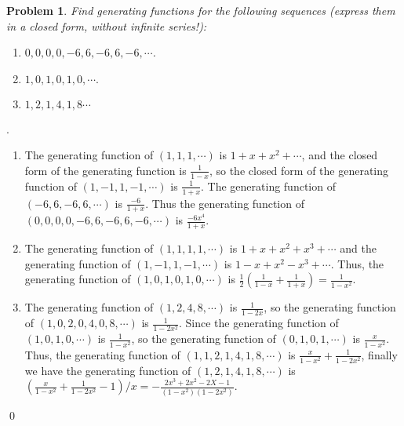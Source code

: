 \documentclass[12pt]{article}
\newtheorem{hw}{Problem}
\newenvironment{sol}
  {\par\vspace{3mm}\noindent{\it Solution}.}
  {\qed}
\begin{document}
\begin{hw} Find generating functions for the following sequences (express them in a closed form, without infinite series!):
\begin{enumerate}
  \item $0,0,0,0,-6,6,-6,6,-6,\cdots$.
  \item $1,0,1,0,1,0,\cdots.$
  \item $1,2,1,4,1,8\cdots$
\end{enumerate}
\end{hw}
\begin{sol}
	\begin{enumerate}
		\item The generating function of $(1,1,1,\cdots)$ is $1 + x + x^2 + \cdots$, and the closed form of the generating function is $\frac{1}{1-x}$, so the closed form of the generating function of $(1,-1,1,-1,\cdots)$ is $\frac{1}{1+x}$. The generating function of $(-6,6,-6,6,\cdots)$ is $\frac{-6}{1+x}$. Thus the generating function of $(0,0,0,0,-6,6,-6,6,-6,\cdots)$ is $\frac{-6x^4}{1+x}$.
		
		\item The generating function of $(1,1,1,1,\cdots)$ is $1 + x + x^2 + x^3 + \cdots$ and the generating function of $(1,-1,1,-1,\cdots)$ is $1 - x + x^2 - x^3 + \cdots$. Thus, the generating function of $(1,0,1,0,1,0,\cdots)$ is $\frac{1}{2}(\frac{1}{1-x}+\frac{1}{1+x}) = \frac{1}{1-x^2}$.
		
		\item The generating function of $(1,2,4,8,\cdots)$ is $\frac{1}{1-2x}$, so the generating function of $(1,0,2,0,4,0,8,\cdots)$ is $\frac{1}{1-2x^2}$. Since the generating function of $(1,0,1,0,\cdots)$ is $\frac{1}{1-x^2}$, so the generating function of $(0,1,0,1,\cdots)$ is $\frac{x}{1-x^2}$. Thus, the generating function of $(1,1,2,1,4,1,8,\cdots)$ is $\frac{x}{1-x^2} + \frac{1}{1-2x^2}$, finally we have the generating function of $(1,2,1,4,1,8,\cdots)$ is $\left(\frac{x}{1-x^2} + \frac{1}{1-2x^2} - 1\right)/x = -\frac{2x^3+2x^2-2X-1}{(1-x^2)(1-2x^2)}$.
	\end{enumerate}
\end{sol}
\end{document}
